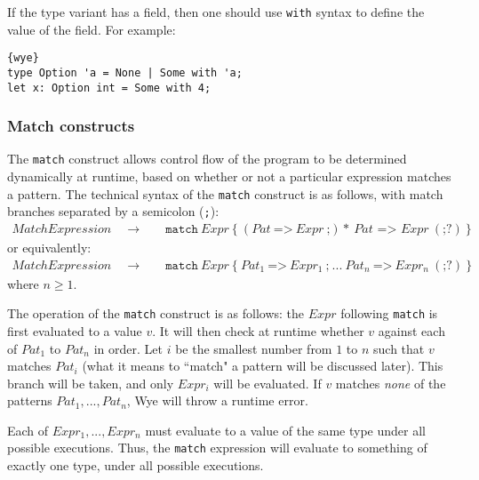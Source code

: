 \documentclass[a4paper, 12pt]{article}
\newcommand{\substo}{\quad\rightarrow\quad}
\begin{document}
If the type variant has a field, then one should use \texttt{with} syntax to define the value of the field. For example:
\begin{lstlisting}{wye}
type Option 'a = None | Some with 'a;
let x: Option int = Some with 4;
\end{lstlisting}

\subsubsection{Match constructs}
The \texttt{match} construct allows control flow of the program to be determined dynamically at runtime, based on whether or not a particular expression matches a pattern. The technical syntax of the \texttt{match} construct is as follows, with match branches separated by a semicolon (\texttt{;}):
\begin{align*}
MatchExpression \substo& \texttt{match}\: Expr \: \texttt{\{} \: (Pat \: \texttt{=>}\: Expr\: \texttt{;})*\: Pat\texttt{ => } Expr \: (\texttt{;}?) \: \texttt{\}}
\end{align*}
or equivalently:
\begin{align*}
MatchExpression \substo& \texttt{match}\: Expr \: \texttt{\{} \: Pat_1 \: \texttt{=>}\: Expr_1\: \texttt{;} \:  ... \: Pat_n \: \texttt{=>}\: Expr_n\: (\texttt{;}?) \: \texttt{\}}
\end{align*}
where $n \geq 1$. 

The operation of the \texttt{match} construct is as follows: the $Expr$ following \texttt{match} is first evaluated to a value $v$. It will then check at runtime whether $v$ against each of $Pat_1$ to $Pat_n$ in order. Let $i$ be the smallest number from $1$ to $n$ such that $v$ matches $Pat_i$ (what it means to ``match" a pattern will be discussed later). This branch will be taken, and only $Expr_i$ will be evaluated. If $v$ matches \textit{none} of the patterns $Pat_1, ..., Pat_n$, Wye will throw a runtime error. 

Each of $Expr_1, ..., Expr_n$ must evaluate to a value of the same type under all possible executions. Thus, the \texttt{match} expression will evaluate to something of exactly one type, under all possible executions.
\end{document}
